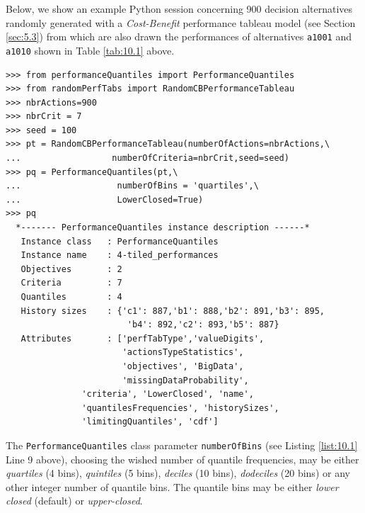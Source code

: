 Below, we show an example Python session concerning 900 decision alternatives randomly generated with a \emph{Cost-Benefit} performance tableau model (see Section \ref{sec:5.3}) from which are also drawn the performances of alternatives \texttt{a1001} and \texttt{a1010} shown in Table \ref{tab:10.1} above.
\begin{lstlisting}[caption={Computing performance quantiles from a given performance tableau},label=list:10.1]
>>> from performanceQuantiles import PerformanceQuantiles
>>> from randomPerfTabs import RandomCBPerformanceTableau
>>> nbrActions=900
>>> nbrCrit = 7
>>> seed = 100
>>> pt = RandomCBPerformanceTableau(numberOfActions=nbrActions,\
...                  numberOfCriteria=nbrCrit,seed=seed)
>>> pq = PerformanceQuantiles(pt,\
...                   numberOfBins = 'quartiles',\
...                   LowerClosed=True)
>>> pq
  *------- PerformanceQuantiles instance description ------*
   Instance class   : PerformanceQuantiles
   Instance name    : 4-tiled_performances
   Objectives       : 2
   Criteria         : 7
   Quantiles        : 4
   History sizes    : {'c1': 887,'b1': 888,'b2': 891,'b3': 895,
                        'b4': 892,'c2': 893,'b5': 887}
   Attributes       : ['perfTabType','valueDigits',
                       'actionsTypeStatistics',
                       'objectives', 'BigData',
                       'missingDataProbability',
		       'criteria', 'LowerClosed', 'name',
		       'quantilesFrequencies', 'historySizes',
		       'limitingQuantiles', 'cdf']
\end{lstlisting}
The \texttt{PerformanceQuantiles} class parameter \texttt{numberOfBins} (see Listing \ref{list:10.1} Line 9 above), choosing the wished number of quantile frequencies, may be either \emph{quartiles} (4 bins), \emph{quintiles} (5 bins), \emph{deciles} (10 bins), \emph{dodeciles} (20 bins) or any other integer number of quantile bins. The quantile bins may be either \emph{lower closed} (default) or \emph{upper-closed}.


